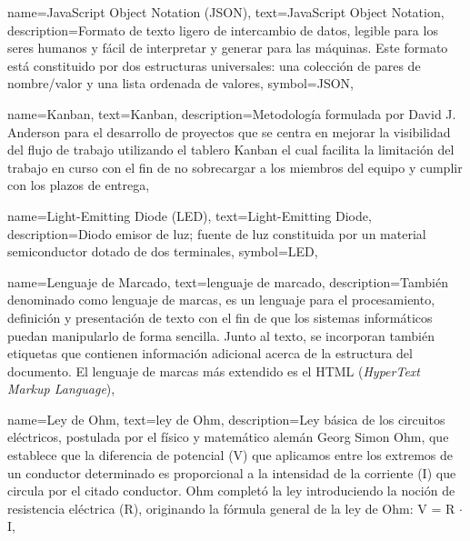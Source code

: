 {
    name={JavaScript Object Notation (JSON)},
    text={JavaScript Object Notation},
    description={Formato de texto ligero de intercambio de datos, legible para los seres humanos y fácil de interpretar y generar para las máquinas. Este formato está constituido por dos estructuras universales: una colección de pares de nombre/valor y una lista ordenada de valores},
    symbol={JSON},
}

{
    name={Kanban},
    text={Kanban},
    description={Metodología formulada por David J. Anderson para el desarrollo de proyectos que se centra en mejorar la visibilidad del flujo de trabajo utilizando el tablero Kanban el cual facilita la limitación del trabajo en curso con el fin de no sobrecargar a los miembros del equipo y cumplir con los plazos de entrega},
}

{
    name={Light-Emitting Diode (LED)},
    text={Light-Emitting Diode},
    description={Diodo emisor de luz; fuente de luz constituida por un material semiconductor dotado de dos terminales},
    symbol={LED},
}

{
    name={Lenguaje de Marcado},
    text={lenguaje de marcado},
    description={También denominado como lenguaje de marcas, es un lenguaje para el procesamiento, definición y presentación de texto con el fin de que los sistemas informáticos puedan manipularlo de forma sencilla. Junto al texto, se incorporan también etiquetas que contienen información adicional acerca de la estructura del documento. El lenguaje de marcas más extendido es el HTML (\textit{HyperText Markup Language})},
}

{
    name={Ley de Ohm},
    text={ley de Ohm},
    description={Ley básica de los circuitos eléctricos, postulada por el físico y matemático alemán Georg Simon Ohm, que establece que la diferencia de potencial (V) que aplicamos entre los extremos de un conductor determinado es proporcional a la intensidad de la corriente (I) que circula por el citado conductor. Ohm completó la ley introduciendo la noción de resistencia eléctrica (R), originando la fórmula general de la ley de Ohm: V = R $\cdot$ I},
}

